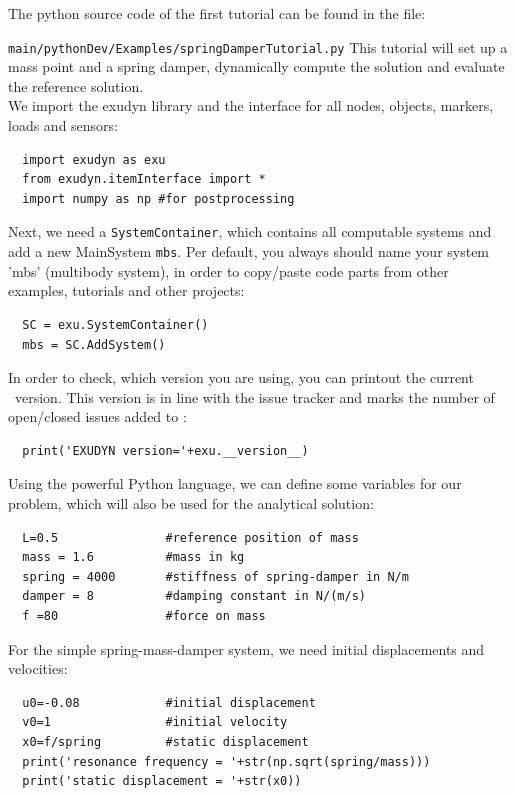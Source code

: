 The python source code of the first tutorial can be found in the file:
\bi
  \item[] \texttt{main/pythonDev/Examples/springDamperTutorial.py}
\ei
This tutorial will set up a mass point and a spring damper, dynamically compute the solution and evaluate the reference solution.
\vspace{6pt}\\
We import the exudyn library and the interface for all nodes, objects, markers, loads and sensors:
\pythonstyle\begin{lstlisting}
  import exudyn as exu
  from exudyn.itemInterface import *
  import numpy as np #for postprocessing
\end{lstlisting}
%
Next, we need a \texttt{SystemContainer}, which contains all computable systems and add a new MainSystem \texttt{mbs}.
Per default, you always should name your system 'mbs' (multibody system), in order to copy/paste code parts from other examples, tutorials and other projects:
\pythonstyle\begin{lstlisting}
  SC = exu.SystemContainer()
  mbs = SC.AddSystem()
\end{lstlisting}
%
In order to check, which version you are using, you can printout the current \codeName\ version. This version is in line with the issue tracker and marks the number of open/closed issues added to \codeName :
\pythonstyle\begin{lstlisting}
  print('EXUDYN version='+exu.__version__)
\end{lstlisting}
%
Using the powerful Python language, we can define some variables for our problem, which will also be used for the analytical solution:
\pythonstyle\begin{lstlisting}
  L=0.5               #reference position of mass
  mass = 1.6          #mass in kg
  spring = 4000       #stiffness of spring-damper in N/m
  damper = 8          #damping constant in N/(m/s)
  f =80               #force on mass
\end{lstlisting}
%
For the simple spring-mass-damper system, we need initial displacements and velocities:
\pythonstyle\begin{lstlisting}
  u0=-0.08            #initial displacement
  v0=1                #initial velocity
  x0=f/spring         #static displacement
  print('resonance frequency = '+str(np.sqrt(spring/mass)))
  print('static displacement = '+str(x0))
\end{lstlisting}
